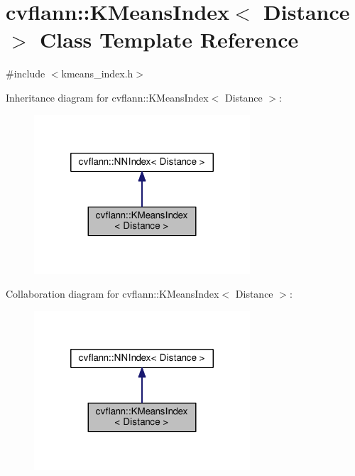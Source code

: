 \hypertarget{classcvflann_1_1KMeansIndex}{\section{cvflann\-:\-:K\-Means\-Index$<$ Distance $>$ Class Template Reference}
\label{classcvflann_1_1KMeansIndex}
}


{\ttfamily \#include $<$kmeans\-\_\-index.\-h$>$}



Inheritance diagram for cvflann\-:\-:K\-Means\-Index$<$ Distance $>$\-:\nopagebreak
\begin{figure}[H]
\begin{center}
\leavevmode
\includegraphics[width=228pt]{classcvflann_1_1KMeansIndex__inherit__graph}
\end{center}
\end{figure}


Collaboration diagram for cvflann\-:\-:K\-Means\-Index$<$ Distance $>$\-:\nopagebreak
\begin{figure}[H]
\begin{center}
\leavevmode
\includegraphics[width=228pt]{classcvflann_1_1KMeansIndex__coll__graph}
\end{center}
\end{figure}
